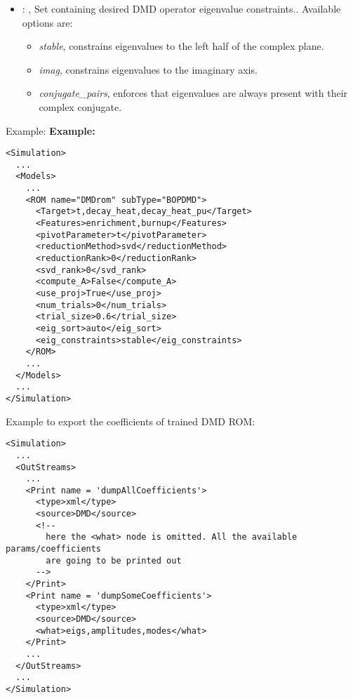 \begin{itemize}
    \item {}: ,
      Set containing desired DMD operator eigenvalue constraints.. Available options are:
      \begin{itemize}                                                    \item \textit{stable},
      constrains eigenvalues to the left half of the complex plane.
      \item  \textit{imag}, constrains eigenvalues to the imaginary axis.
      \item  \textit{conjugate\_pairs}, enforces that eigenvalues are always present with their
      complex conjugate.                                                  \end{itemize}
  \end{itemize}

\hspace{24pt}
Example:
\textbf{Example:}
\begin{lstlisting}[style=XML,morekeywords={name,subType}]
<Simulation>
  ...
  <Models>
    ...
    <ROM name="DMDrom" subType="BOPDMD">
      <Target>t,decay_heat,decay_heat_pu</Target>
      <Features>enrichment,burnup</Features>
      <pivotParameter>t</pivotParameter>
      <reductionMethod>svd</reductionMethod>
      <reductionRank>0</reductionRank>
      <svd_rank>0</svd_rank>
      <compute_A>False</compute_A>
      <use_proj>True</use_proj>
      <num_trials>0</num_trials>
      <trial_size>0.6</trial_size>
      <eig_sort>auto</eig_sort>
      <eig_constraints>stable</eig_constraints>
    </ROM>
    ...
  </Models>
  ...
</Simulation>
\end{lstlisting}

Example to export the coefficients of trained DMD ROM:
\begin{lstlisting}[style=XML,morekeywords={name,subType}]
<Simulation>
  ...
  <OutStreams>
    ...
    <Print name = 'dumpAllCoefficients'>
      <type>xml</type>
      <source>DMD</source>
      <!--
        here the <what> node is omitted. All the available params/coefficients
        are going to be printed out
      -->
    </Print>
    <Print name = 'dumpSomeCoefficients'>
      <type>xml</type>
      <source>DMD</source>
      <what>eigs,amplitudes,modes</what>
    </Print>
    ...
  </OutStreams>
  ...
</Simulation>
\end{lstlisting}


